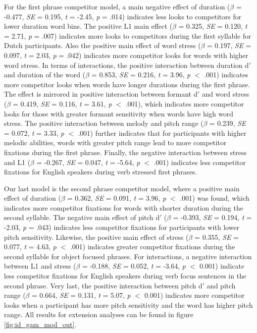  For the first phrase competitor model, a main negative effect of duration ($\beta$ = -0.477, \textit{SE} = 0.195, \textit{t} = -2.45, \textit{p} = .014) indicates less looks to competitors for lower duration word bins. The positive L1 main effect ($\beta$ = 0.325, \textit{SE} = 0.120, \textit{t} = 2.71, \textit{p} = .007) indicates more looks to competitors during the first syllable for Dutch participants. Also the positive main effect of word stress ($\beta$ = 0.197, \textit{SE} = 0.097, \textit{t} = 2.03, \textit{p} = .042) indicates more competitor looks for words with higher word stress. In terms of interactions, the positive interaction between duration d$'$ and duration of the word ($\beta$ = 0.853, \textit{SE} = 0.216, \textit{t} = 3.96, \textit{p} $<$ .001) indicates more competitor looks when words have longer durations during the first phrase. The effect is mirrored in positive interaction between formant d$'$ and word stress ($\beta$ = 0.419, \textit{SE} = 0.116, \textit{t} = 3.61, \textit{p} $<$ .001), which indicates more competitor looks for those with greater formant sensitivity when words have high word stress. The positive interaction between melody and pitch range ($\beta$ = 0.239, \textit{SE} = 0.072, \textit{t} = 3.33, \textit{p} $<$ .001) further indicates that for participants with higher melodic abilities, words with greater pitch range lead to more competitor fixations during the first phrase. Finally, the negative interaction between stress and L1 ($\beta$ = -0.267, \textit{SE} = 0.047, \textit{t} = -5.64, \textit{p} $<$ .001) indicates less competitor fixations for English speakers during verb stressed first phrases.

Our last model is the second phrase competitor model, where a positive main effect of duration ($\beta$ = 0.362, \textit{SE} = 0.091, \textit{t} = 3.96, \textit{p} $<$ .001) was found, which indicates more competitor fixations for words with shorter duration during the second syllable. The negative main effect of pitch d$'$ ($\beta$ = -0.393, \textit{SE} = 0.194, \textit{t} = -2.03, \textit{p} = .043) indicates less competitor fixations for participants with lower pitch sensitivity. Likewise, the positive main effect of stress ($\beta$ = 0.355, \textit{SE} = 0.077, \textit{t} = 4.63, \textit{p} $<$ .001) indicates greater competitor fixations during the second syllable for object focused phrases. For interactions, a negative interaction between L1 and stress ($\beta$ = -0.188, \textit{SE} = 0.052, \textit{t} = -3.64, \textit{p} $<$ 0.001) indicate less competitor fixations for English speakers during verb focus sentences in the second phrase. Very last, the positive interaction between pitch d$'$ and pitch range ($\beta$ = 0.664, \textit{SE} = 0.131, \textit{t} = 5.07, \textit{p} $<$ 0.001) indicates more competitor looks when a participant has more pitch sensitivity and the word has higher pitch range. All results for extension analyses can be found in figure \ref{fig:id_gam_mod_out}.

